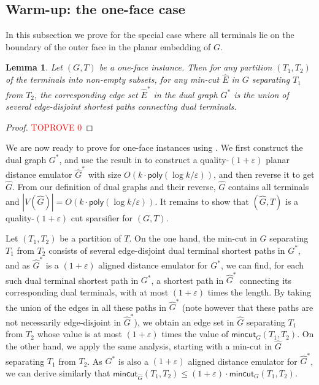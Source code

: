 \documentclass[11pt]{article}
\newtheorem{lemma}[theorem]{Lemma}
\theoremstyle{definition}
\newcommand{\eps}{{\varepsilon}}
\newcommand{\poly}{\mathsf{poly}}
\newcounter{note}
\newcommand{\mc}{\mathsf{mincut}}
\begin{document}
\subsection{Warm-up: the one-face case}
\label{sec: 1-face}

In this subsection we prove  for the special case where all terminals lie on the boundary of the outer face in the planar embedding of $G$.



\begin{lemma}
	\label{lem: mincut structure}
Let $(G,T)$ be a one-face instance. Then for any partition $(T_1,T_2)$ of the terminals into non-empty subsets, for any min-cut $\hat E$ in $G$ separating $T_1$ from $T_2$, the corresponding edge set $\hat E^*$ in the dual graph $G^*$ is the union of several edge-disjoint shortest paths connecting dual terminals.
\end{lemma}

\begin{proof}\textcolor{red}{TOPROVE 0}\end{proof}


We are now ready to prove  for one-face instances using .
We first construct the dual graph $G^*$, and use the result in \cite{chang2022near} to construct a quality-$(1+\eps)$ planar distance emulator $\hat G^*$ with size $O(k\cdot \poly(\log k/\eps))$, and then reverse it to get $\hat G$. 
From our definition of dual graphs and their reverse, $\hat G$ contains all terminals and $|V(\hat G)|=O(k\cdot \poly(\log k/\eps))$. It remains to show that $(\hat G,T)$ is a quality-$(1+\eps)$ cut sparsifier for $(G,T)$. 

Let $(T_1,T_2)$ be a partition of $T$.
On the one hand, the min-cut in $G$ separating $T_1$ from $T_2$ consists of several edge-disjoint dual terminal shortest paths in $G^*$, and as $\hat G^*$ is a $(1+\eps)$ aligned distance emulator for $G^*$, we can find, for each such dual terminal shortest path in $G^*$, a shortest path in $\hat G^*$ connecting its corresponding dual terminals, with at most $(1+\eps)$ times the length. By taking the union of the edges in all these paths in $\hat G^*$ (note however that these paths are not necessarily edge-disjoint in $\hat G^*$), we obtain an edge set in $\hat G$ separating $T_1$ from $T_2$ whose value is at most $(1+\eps)$ times the value of $\mc_G(T_1,T_2)$. 
On the other hand, we apply the same analysis, starting with a min-cut in $\hat G$ separating $T_1$ from $T_2$. As $G^*$ is also a $(1+\eps)$ aligned distance emulator for $\hat G^*$, we can derive similarly that $\mc_{\hat G}(T_1,T_2)\le (1+\eps)\cdot \mc_G(T_1,T_2)$.
\end{document}
